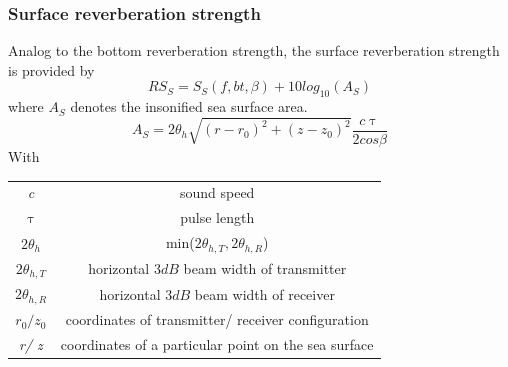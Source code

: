 \subsubsection{ Surface reverberation strength } \label{ Surface reverberation strength }
\noindent Analog to the bottom reverberation strength, the surface reverberation strength is provided by
\begin{equation}
\textit{$RS_S$} = \textit{$S_{S}(f,bt,\beta)$} + 10 log_{10}{(A_S)}
\end{equation}
\noindent where \textit{$A_S$} denotes the insonified sea surface area.
\begin{equation}
\textit{$A_S$} = 2 \theta_{h} \sqrt{ (\textit{r} - \textit{$r_{0}$})^{2} + (\textit{z} - \textit{$z_{0}$})^{2} } \frac{ c \uptau }{ 2 cos{\beta}}
\end{equation}
\noindent With
\begin{center}
\begin{tabular}{ |c|c| } 
 \hline
  \textit{c} & sound speed  \\ 
  $\uptau$ & pulse length \\ 
  $2 \theta_{h}$  & min($2\theta_{h,T}, 2\theta_{h,R}$)  \\ 
  $2\theta_{h,T}$ &  horizontal $3 dB$ beam width of transmitter \\
  $2\theta_{h,R}$  & horizontal $3 dB$ beam width of receiver \\ 
  \textit{$r_0/ z_0$} & coordinates of transmitter/ receiver configuration \\
  \textit{r/ z} & coordinates of a particular point on the sea surface\\
  \hline
\end{tabular}
\end{center}

